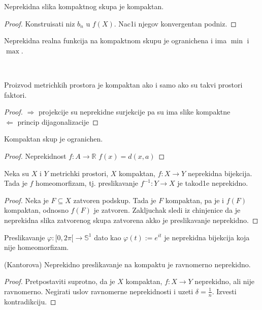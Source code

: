 \documentclass[a4paper,12pt]{article}
\newcommand{\RR}{\mathbb{R}}
\newcommand{\psj}{\subseteq}
\begin{document}
\begin{tvr}
Neprekidna slika kompaktnog skupa je kompaktan.
\end{tvr}
\begin{proof}
Konstruisati niz $b_n$ u $f(X)$. Nac1i njegov konvergentan podniz.
\end{proof}

\begin{posl}
Neprekidna realna funkcija na kompaktnom skupu je ogranichena i ima $\min$ i $\max$.
\end{posl}
\\
\begin{tvr}
Proizvod metrichkih prostora je kompaktan ako i samo ako su takvi prostori faktori.
\end{tvr}
\begin{proof}
$\boxed{\Rightarrow}$ projekcije su neprekidne surjekcije pa su ima slike kompaktne \\
$\boxed{\Leftarrow}$ princip dijagonalizacije
\end{proof}

\begin{tvr}
Kompaktan skup je ogranichen.
\end{tvr}
\begin{proof}
Neprekidnost $f: A \to \RR$ $f(x)=d(x,a)$
\end{proof}

\begin{tvr}
Neka su $X$ i $Y$ metrichki prostori, $X$ kompaktan, $f: X \to Y$ neprekidna bijekcija. Tada je $f$ homeomorfizam, tj. preslikavanje $f^{-1}:Y \to X$ je takod1e neprekidno.
\end{tvr}
\begin{proof}
Neka je $F \psj X$ zatvoren podskup. Tada je $F$ kompaktan, pa je i $f(F)$ kompaktan, odnosno $f(F)$ je zatvoren. Zakljuchak sledi iz chinjenice da je neprekidna slika zatvorenog skupa zatvorena akko je preslikavanje neprekidno.
\end{proof}

\begin{nap}
Preslikavanje $\varphi: [0,2 \pi[ \to \mathbb{S}^1$ dato kao $ \varphi(t):= e^{it}$ je neprekidna bijekcija koja nije homeomorfizam.
\end{nap}

\begin{tma}
(Kantorova) Neprekidno preslikavanje na kompaktu je ravnomerno neprekidno.
\end{tma}
\begin{proof}
Pretpostaviti suprotno, da je $X$ kompaktan, $f:X \to Y$ neprekidno, ali nije ravnomerno. Negirati uslov ravnomerne neprekidnosti i uzeti $\delta = \frac{1}{n}$.  Izvesti kontradikciju. 
\end{proof}
\end{document}
